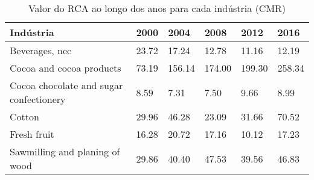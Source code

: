 \begin{table}
\centering
\caption{Valor do RCA ao longo dos anos para cada indústria (CMR)}
\begin{tabular}{p{6cm}p{1.5cm}p{1.5cm}p{1.5cm}p{1.5cm}p{1.5cm}}
\toprule
                              Indústria &  2000 &   2004 &   2008 &   2012 &   2016 \\
\midrule
                         Beverages, nec & 23.72 &  17.24 &  12.78 &  11.16 &  12.19 \\
               Cocoa and cocoa products & 73.19 & 156.14 & 174.00 & 199.30 & 258.34 \\
Cocoa chocolate and sugar confectionery &  8.59 &   7.31 &   7.50 &   9.66 &   8.99 \\
                                 Cotton & 29.96 &  46.28 &  23.09 &  31.66 &  70.52 \\
                            Fresh fruit & 16.28 &  20.72 &  17.16 &  10.12 &  17.23 \\
         Sawmilling and planing of wood & 29.86 &  40.40 &  47.53 &  39.56 &  46.83 \\
\bottomrule
\end{tabular}
\end{table}
